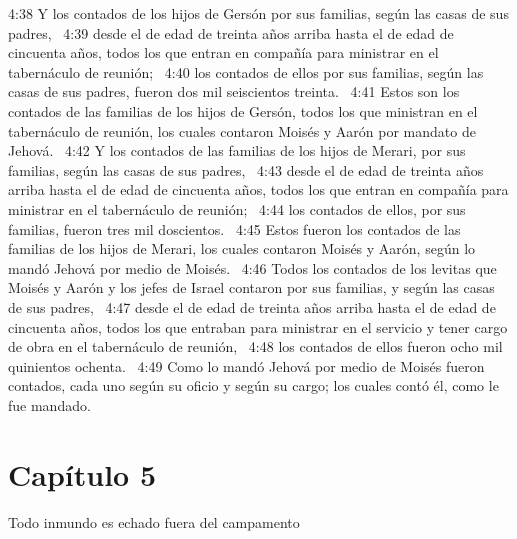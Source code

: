 4:38 Y los contados de los hijos de Gersón por sus familias, según las casas de sus padres,  
4:39 desde el de edad de treinta años arriba hasta el de edad de cincuenta años, todos los que entran en compañía para ministrar en el tabernáculo de reunión;  
4:40 los contados de ellos por sus familias, según las casas de sus padres, fueron dos mil seiscientos treinta.  
4:41 Estos son los contados de las familias de los hijos de Gersón, todos los que ministran en el tabernáculo de reunión, los cuales contaron Moisés y Aarón por mandato de Jehová.  
4:42 Y los contados de las familias de los hijos de Merari, por sus familias, según las casas de sus padres,  
4:43 desde el de edad de treinta años arriba hasta el de edad de cincuenta años, todos los que entran en compañía para ministrar en el tabernáculo de reunión;  
4:44 los contados de ellos, por sus familias, fueron tres mil doscientos.  
4:45 Estos fueron los contados de las familias de los hijos de Merari, los cuales contaron Moisés y Aarón, según lo mandó Jehová por medio de Moisés.  
4:46 Todos los contados de los levitas que Moisés y Aarón y los jefes de Israel contaron por sus familias, y según las casas de sus padres,  
4:47 desde el de edad de treinta años arriba hasta el de edad de cincuenta años, todos los que entraban para ministrar en el servicio y tener cargo de obra en el tabernáculo de reunión,  
4:48 los contados de ellos fueron ocho mil quinientos ochenta.  
4:49 Como lo mandó Jehová por medio de Moisés fueron contados, cada uno según su oficio y según su cargo; los cuales contó él, como le fue mandado.  
\section*{Capítulo 5}
Todo inmundo es echado fuera del campamento  

